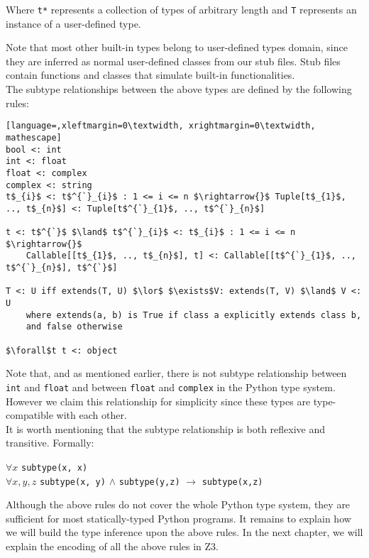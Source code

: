 Where \lstinline|t*| represents a collection of types of arbitrary length and \lstinline|T| represents an instance of a user-defined type.

Note that most other built-in types belong to user-defined types domain, since they are inferred as normal user-defined classes from our stub files. Stub files contain functions and classes that simulate built-in functionalities. \\

The subtype relationships between the above types are defined by the following rules:

\begin{lstlisting}[language=,xleftmargin=0\textwidth, xrightmargin=0\textwidth, mathescape]
bool <: int
int <: float
float <: complex
complex <: string
t$_{i}$ <: t$^{`}_{i}$ : 1 <= i <= n $\rightarrow{}$ Tuple[t$_{1}$, .., t$_{n}$] <: Tuple[t$^{`}_{1}$, .., t$^{`}_{n}$]

t <: t$^{`}$ $\land$ t$^{`}_{i}$ <: t$_{i}$ : 1 <= i <= n $\rightarrow{}$
	Callable[[t$_{1}$, .., t$_{n}$], t] <: Callable[[t$^{`}_{1}$, .., t$^{`}_{n}$], t$^{`}$]
	
T <: U iff extends(T, U) $\lor$ $\exists$V: extends(T, V) $\land$ V <: U 
	where extends(a, b) is True if class a explicitly extends class b,
	and false otherwise
	
$\forall$t t <: object
\end{lstlisting}

Note that, and as mentioned earlier, there is not subtype relationship between \lstinline|int| and \lstinline|float| and between \lstinline|float| and \lstinline|complex| in the Python type system. However we claim this relationship for simplicity since these types are type-compatible with each other.\\

It is worth mentioning that the subtype relationship is both reflexive and transitive. Formally:


\begin{center}
	$\forall x$ \lstinline|subtype(x, x)| \\
	$\forall x,y,z$ \lstinline|subtype(x, y)| $\land$ \lstinline|subtype(y,z)| $\rightarrow$ \lstinline|subtype(x,z)|
\end{center}

Although the above rules do not cover the whole Python type system, they are sufficient for most statically-typed Python programs. It remains to explain how we will build the type inference upon the above rules. In the next chapter, we will explain the encoding of all the above rules in Z3.
